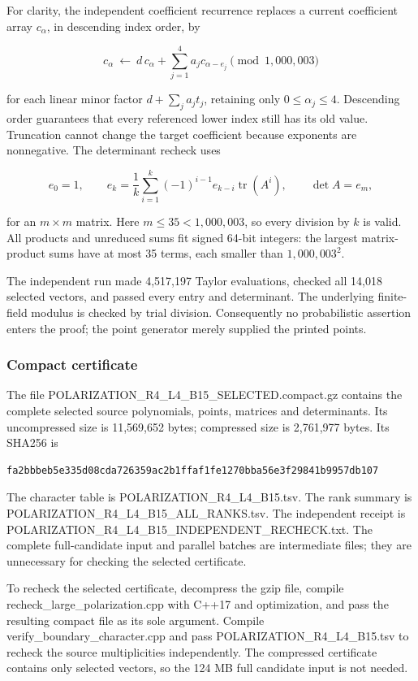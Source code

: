 \documentclass[
  10pt,
]{article}
\begin{document}
For clarity, the independent coefficient recurrence replaces a current
coefficient array \(c_\alpha\), in descending index order, by

\[
 c_\alpha\ \leftarrow\
 d\,c_\alpha+\sum_{j=1}^4a_jc_{\alpha-e_j}
 \pmod {1,000,003}
\]

for each linear minor factor \(d+\sum_j a_jt_j\), retaining only
\(0\le\alpha_j\le4\). Descending order guarantees that every referenced
lower index still has its old value. Truncation cannot change the target
coefficient because exponents are nonnegative. The determinant recheck
uses

\[
 e_0=1,\qquad
 e_k=\frac1k\sum_{i=1}^k(-1)^{i-1}e_{k-i}\operatorname{tr}(A^i),
 \qquad\det A=e_m,
\]

for an \(m\times m\) matrix. Here \(m\le35<1,000,003\), so every
division by \(k\) is valid. All products and unreduced sums fit signed
64-bit integers: the largest matrix-product sums have at most 35 terms,
each smaller than \(1,000,003^2\).

The independent run made 4,517,197 Taylor evaluations, checked all
14,018 selected vectors, and passed every entry and determinant. The
underlying finite-field modulus is checked by trial division.
Consequently no probabilistic assertion enters the proof; the point
generator merely supplied the printed points.

\subsubsection{Compact certificate}\label{compact-certificate}

The file POLARIZATION\_R4\_L4\_B15\_SELECTED.compact.gz contains the
complete selected source polynomials, points, matrices and determinants.
Its uncompressed size is 11,569,652 bytes; compressed size is 2,761,977
bytes. Its SHA256 is

\begin{verbatim}
fa2bbbeb5e335d08cda726359ac2b1ffaf1fe1270bba56e3f29841b9957db107
\end{verbatim}

The character table is POLARIZATION\_R4\_L4\_B15.tsv. The rank summary
is POLARIZATION\_R4\_L4\_B15\_ALL\_RANKS.tsv. The independent receipt is
POLARIZATION\_R4\_L4\_B15\_INDEPENDENT\_RECHECK.txt. The complete
full-candidate input and parallel batches are intermediate files; they
are unnecessary for checking the selected certificate.

To recheck the selected certificate, decompress the gzip file, compile
recheck\_large\_polarization.cpp with C++17 and optimization, and pass
the resulting compact file as its sole argument. Compile
verify\_boundary\_character.cpp and pass POLARIZATION\_R4\_L4\_B15.tsv
to recheck the source multiplicities independently. The compressed
certificate contains only selected vectors, so the 124 MB full candidate
input is not needed.
\end{document}
